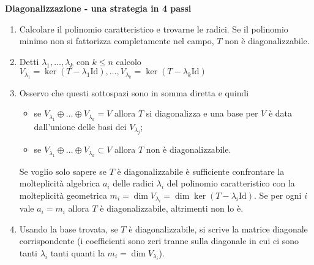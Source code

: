 \documentclass[9pt, a4paper]{article}
\newcommand{\Id}{\mathrm{Id}}
\theoremstyle{mythm}
\begin{document}
\begin{framed}
	\begin{center}
		\textbf{Diagonalizzazione - una strategia in 4 passi}
	\end{center}
	\begin{enumerate}
		\item Calcolare il polinomio caratteristico e trovarne le radici. Se il polinomio minimo non si fattorizza completamente nel campo, $ T $ non è diagonalizzabile. 
		\item Detti $ \lambda_1, \ldots, \lambda_k $ con $ k \leq n $ calcolo $ V_{\lambda_1} = \ker(T - \lambda_1 \Id), \ldots, V_{\lambda_k} = \ker(T - \lambda_k \Id) $
		\item Osservo che questi sottospazi sono in somma diretta e quindi 
			\begin{itemize}
				\item se $ V_{\lambda_1} \oplus \ldots \oplus V_{\lambda_k} = V $ allora $ T $ si diagonalizza e una base per $ V $ è data dall'unione delle basi dei $ V_{\lambda_j} $;
				\item se $ V_{\lambda_1} \oplus \ldots \oplus V_{\lambda_k} \subset V $ allora $ T $ non è diagonalizzabile.
			\end{itemize} 
		Se voglio solo sapere se $ T $ è diagonalizzabile è sufficiente confrontare la molteplicità algebrica $ a_i $ delle radici $ \lambda_i $ del polinomio caratteristico con la molteplicità geometrica $ m_i = \dim V_{\lambda_i} = \dim \ker (T - \lambda_i \Id) $. Se per ogni $ i $ vale $ a_i = m_i $ allora $ T $ è diagonalizzabile, altrimenti non lo è. 
		\item Usando la base trovata, se $ T $ è diagonalizzabile, si scrive la matrice diagonale corrispondente (i coefficienti sono zeri tranne sulla diagonale in cui ci sono tanti $ \lambda_i $ tanti quanti la $ m_i = \dim V_{\lambda_i} $). 
	\end{enumerate} 
\end{framed}
\end{document}
